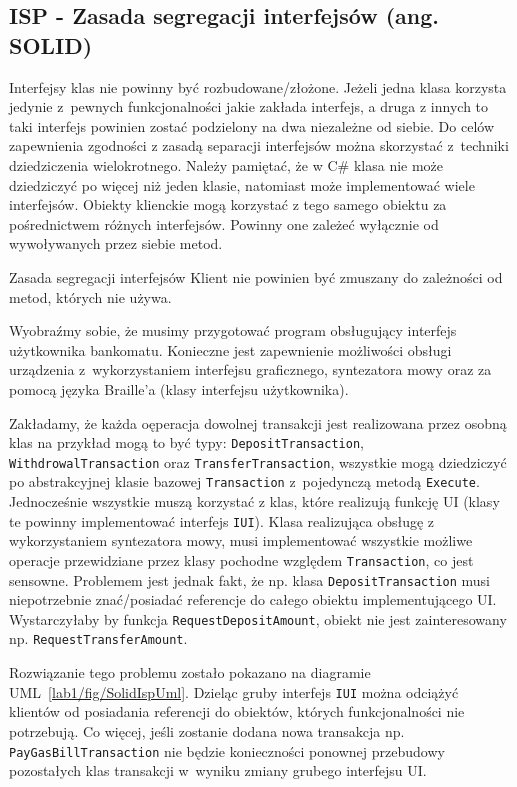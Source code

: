 \subsection{ISP - Zasada segregacji interfejsów (ang. SOL\textbf{I}D)}

Interfejsy klas nie powinny być rozbudowane/złożone. Jeżeli jedna klasa korzysta jedynie z~pewnych funkcjonalności jakie zakłada interfejs, a druga z innych to taki interfejs powinien zostać podzielony na dwa niezależne od siebie. Do celów zapewnienia zgodności z zasadą separacji interfejsów można skorzystać z~techniki dziedziczenia wielokrotnego. Należy pamiętać, że w C\# klasa nie może dziedziczyć po więcej niż jeden klasie, natomiast może implementować wiele interfejsów. Obiekty klienckie mogą korzystać z tego samego obiektu za pośrednictwem różnych interfejsów. Powinny one zależeć wyłącznie od wywoływanych przez siebie metod.  

\begin{myboxWithTitle}{Zasada segregacji interfejsów}
Klient nie powinien być zmuszany do zależności od metod, których nie używa.
\end{myboxWithTitle}

Wyobraźmy sobie, że musimy przygotować program obsługujący interfejs użytkownika bankomatu. Konieczne jest zapewnienie możliwości obsługi urządzenia z~wykorzystaniem interfejsu graficznego, syntezatora mowy oraz za pomocą języka Braille'a (klasy interfejsu użytkownika). 

Zakładamy, że każda oęperacja dowolnej transakcji jest realizowana przez osobną klas na przykład mogą to być typy: \texttt{DepositTransaction}, \texttt{WithdrowalTransaction} oraz \texttt{TransferTransaction}, wszystkie mogą dziedziczyć po abstrakcyjnej klasie bazowej \texttt{Transaction} z~pojedynczą metodą \texttt{Execute}. Jednocześnie wszystkie muszą korzystać z klas, które realizują funkcję UI (klasy te powinny implementować interfejs \texttt{IUI}). Klasa realizująca obsługę z wykorzystaniem syntezatora mowy, musi implementować wszystkie możliwe operacje przewidziane przez klasy pochodne względem \texttt{Transaction}, co jest sensowne. Problemem jest jednak fakt, że np. klasa \texttt{DepositTransaction} musi niepotrzebnie znać/posiadać referencje do całego obiektu implementującego UI. Wystarczyłaby by funkcja \texttt{RequestDepositAmount}, obiekt nie jest zainteresowany np. \texttt{RequestTransferAmount}. 

Rozwiązanie tego problemu zostało pokazano na diagramie UML~\ref{lab1/fig/SolidIspUml}. Dzieląc gruby interfejs \texttt{IUI} można odciążyć klientów od posiadania referencji do obiektów, których funkcjonalności nie potrzebują. Co więcej, jeśli zostanie dodana nowa transakcja np. \texttt{PayGasBillTransaction} nie będzie konieczności ponownej przebudowy pozostałych klas transakcji w~wyniku zmiany grubego interfejsu UI. 

